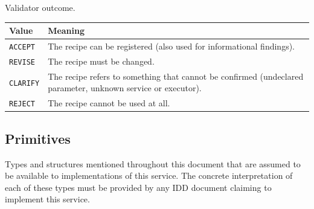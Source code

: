 \documentclass[a4paper]{arrowhead}
\begin{document}
Validator outcome.

{\small
\begin{longtable}{|p{3.9cm}|p{11.9cm}|}

\hline
\rowcolor{gray!33} Value & Meaning \\ \hline
\endhead
\texttt{ACCEPT} & The recipe can be registered (also used for informational findings). \\ \hline
\texttt{REVISE} & The recipe must be changed. \\ \hline
\texttt{CLARIFY} & The recipe refers to something that cannot be confirmed (undeclared parameter, unknown service or executor). \\ \hline
\texttt{REJECT} & The recipe cannot be used at all. \\ \hline
\end{longtable}
}


\subsection{Primitives}
\label{sec:model:primitives}
Types and structures mentioned throughout this document that are assumed to be available to implementations of this
service. The concrete interpretation of each of these types must be provided by any IDD document claiming to implement
this service.
\end{document}
